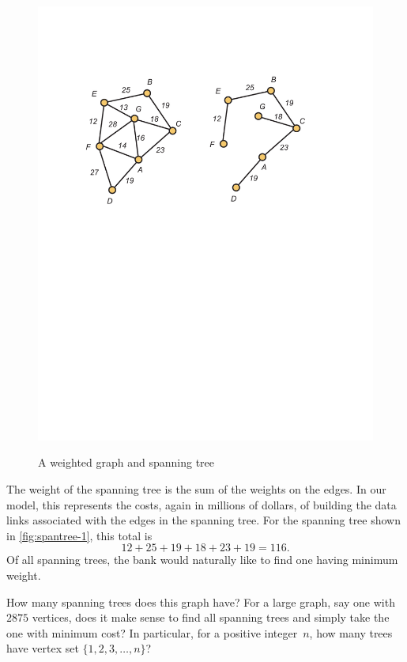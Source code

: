 \begin{example}
\begin{figure}
\begin{center}
\includegraphics[viewport=82 420 500 677, scale=.6]{intro-figs/3012-fig19}\\
\end{center}
\caption{A weighted graph and spanning tree}
\label{fig:spantree-1}
\end{figure}

The weight of the spanning tree is the sum of the weights on the
edges.  In our model, this represents the costs, again in millions of
dollars, of building the data links associated with the edges in the
spanning tree.  For the spanning tree shown in
\autoref{fig:spantree-1}, this total is
\[
12+25+19+18+23+19 = 116.
\]
Of all spanning trees, the bank would naturally like to find one
having minimum weight.

How many spanning trees does this graph have?  For a large graph, say
one with $2875$ vertices, does it make sense to find all spanning
trees and simply take the one with minimum cost?  In particular, for a
positive integer~$n$, how many trees have vertex set
$\{1,2,3,\dots,n\}$?
\end{example}

